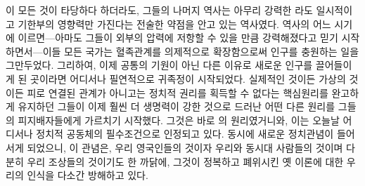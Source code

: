 이 모든 것이
타당하다 하더라도, 그들의 나머지 역사는
아무리 강력한 라도 일시적이고 기한부의 영향력만 가진다는
전술한 약점을 안고 있는 역사였다.
역사의 어느 시기에 이르면---아마도 그들이 외부의 압력에 저항할 수 있을 만큼
강력해졌다고 믿기 시작하면서---이들 모든 국가는
혈족관계를 의제적으로 확장함으로써 인구를 충원하는 일을 그만두었다.
그리하여,
이제 공통의 기원이 아닌 다른 이유로 새로운 인구를 끌어들이게 된 곳이라면
어디서나 필연적으로 귀족정이 시작되었다.
실제적인 것이든 가상의 것이든
피로 연결된 관계가 아니고는 정치적 권리를 획득할 수 없다는
핵심원리를 완고하게 유지하던 그들이 이제
훨씬 더 생명력이 강한 것으로 드러난
어떤 다른 원리를
그들의 피지배자들에게
가르치기 시작했다.
그것은 바로 의 원리였거니와,
이는 오늘날 어디서나 정치적 공동체의 필수조건으로 인정되고 있다.
동시에 새로운 정치관념이 들어서게 되었으니,
이 관념은,
우리 영국인들의 것이자 우리와 동시대 사람들의 것이며
다분히 우리 조상들의 것이기도 한 까닭에,
그것이 정복하고 폐위시킨 옛 이론에 대한 우리의 인식을 다소간
방해하고 있다.

